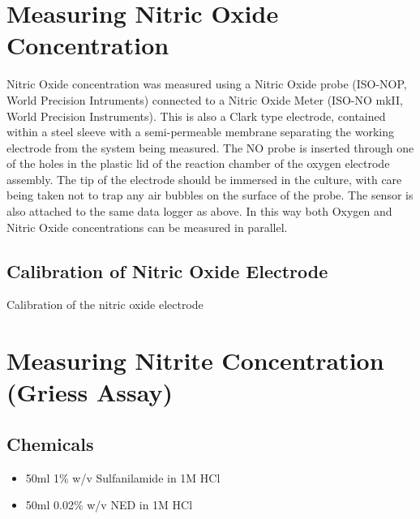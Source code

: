 \section{Measuring Nitric Oxide Concentration}
Nitric Oxide concentration was measured using a Nitric Oxide probe (ISO-NOP, World Precision Intruments) connected to a Nitric Oxide Meter (ISO-NO mkII, World Precision Instruments). This is also a Clark type electrode, contained within a steel sleeve with a semi-permeable membrane separating the working electrode from the system being measured\cite{Liu2005,Bedioui2003,Serpe2007}. The NO probe is inserted through one of the holes in the plastic lid of the reaction chamber of the oxygen electrode assembly. The tip of the electrode should be immersed in the culture, with care being taken not to trap any air bubbles on the surface of the probe. The sensor is also attached to the same data logger as above. In this way both Oxygen and Nitric Oxide concentrations can be measured in parallel.
\subsection{Calibration of Nitric Oxide Electrode}
Calibration of the nitric oxide electrode 

\section{Measuring Nitrite Concentration (Griess Assay)}
\cite{DonaldNicholas1957}
\subsection*{Chemicals}
\begin{itemize}
 \item 50ml 1\% w/v Sulfanilamide in 1M HCl
 \item 50ml 0.02\% w/v NED in 1M HCl
\end{itemize}


